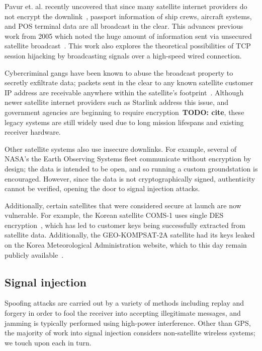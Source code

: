Pavur et. al. recently uncovered that since many satellite internet providers do not encrypt the downlink~\cite{pavur2020tale}, passport information of ship crews, aircraft systems, and POS terminal data are all broadcast in the clear.
This advances previous work from 2005 which noted the huge amount of information sent via unsecured satellite broadcast~\cite{adelsbach2005satellite}.
This work also explores the theoretical possibilities of TCP session hijacking by broadcasting signals over a high-speed wired connection.

Cybercriminal gangs have been known to abuse the broadcast property to secretly exfiltrate data; packets sent in the clear to any known satellite customer IP address are receivable anywhere within the satellite's footprint~\cite{satellite_apt}.
Although newer satellite internet providers such as Starlink address this issue, and government agencies are beginning to require encryption~\textbf{TODO: cite}, these legacy systems are still widely used due to long mission lifespans and existing receiver hardware.

Other satellite systems also use insecure downlinks.
For example, several of NASA's the Earth Observing Systems fleet communicate without encryption by design; the data is intended to be open, and so running a custom groundstation is encouraged.
However, since the data is not cryptographically signed, authenticity cannot be verified, opening the door to signal injection attacks.

Additionally, certain satellites that were considered secure at launch are now vulnerable.
For example, the Korean satellite COMS-1 uses single DES encryption~\cite{lrit-key-dec}, which has led to customer keys being successfully extracted from satellite data.
Additionally, the GEO-KOMPSAT-2A satellite had its keys leaked on the Korea Meteorological Administration website, which to this day remain publicly available~\cite{xrit-rx}.

\subsection{Signal injection}

Spoofing attacks are carried out by a variety of methods including replay and forgery in order to fool the receiver into accepting illegitimate messages, and jamming is typically performed using high-power interference.
Other than GPS, the majority of work into signal injection considers non-satellite wireless systems; we touch upon each in turn.

